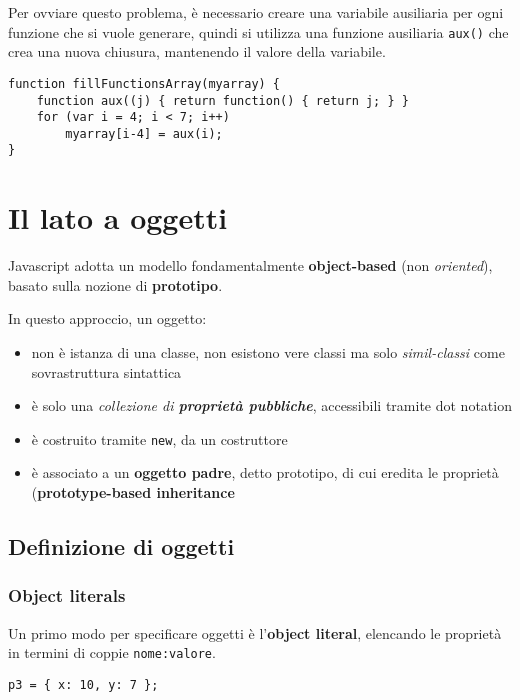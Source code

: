 Per ovviare questo problema, è necessario creare una variabile ausiliaria per ogni funzione che si vuole generare, quindi si utilizza una funzione ausiliaria \texttt{aux()} che crea una nuova chiusura, mantenendo il valore della variabile.
\begin{verbatim}
function fillFunctionsArray(myarray) {
    function aux((j) { return function() { return j; } }
    for (var i = 4; i < 7; i++)
        myarray[i-4] = aux(i);
}
\end{verbatim}

\section{Il lato a oggetti}
Javascript adotta un modello fondamentalmente \textbf{object-based} (non \textit{oriented}), basato sulla nozione di \textbf{prototipo}.

In questo approccio, un oggetto:
\begin{itemize}
    \item non è istanza di una classe, non esistono vere classi ma solo \textit{simil-classi} come sovrastruttura sintattica
    \item è solo una \textit{collezione di \textbf{proprietà pubbliche}}, accessibili tramite dot notation
    \item è costruito tramite \texttt{new}, da un costruttore
    \item è associato a un \textbf{oggetto padre}, detto prototipo, di cui eredita le proprietà (\textbf{prototype-based inheritance}
\end{itemize}

\subsection{Definizione di oggetti}

\subsubsection{Object literals}

Un primo modo per specificare oggetti è l'\textbf{object literal}, elencando le proprietà in termini di coppie \texttt{nome:valore}.
\begin{verbatim}
p3 = { x: 10, y: 7 };
\end{verbatim}

